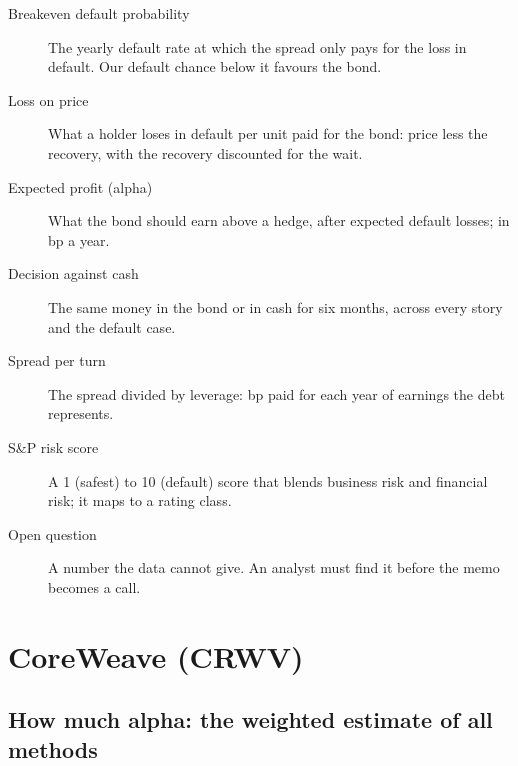 \documentclass[11pt,a4paper]{article}
\begin{document}
\begin{description}
\item[Breakeven default probability] The yearly default rate at which the spread only pays for the loss in default. Our default chance below it favours the bond.
\item[Loss on price] What a holder loses in default per unit paid for the bond: price less the recovery, with the recovery discounted for the wait.
\item[Expected profit (alpha)] What the bond should earn above a hedge, after expected default losses; in bp a year.
\item[Decision against cash] The same money in the bond or in cash for six months, across every story and the default case.
\item[Spread per turn] The spread divided by leverage: bp paid for each year of earnings the debt represents.
\item[S\&P risk score] A 1 (safest) to 10 (default) score that blends business risk and financial risk; it maps to a rating class.
\item[Open question] A number the data cannot give. An analyst must find it before the memo becomes a call.
\end{description}
\newpage
\section*{CoreWeave (CRWV)}\label{memo-start-CRWV}
\par\noindent{}

\subsection*{How much alpha: the weighted estimate of all methods}
\par\noindent{}
\end{document}
